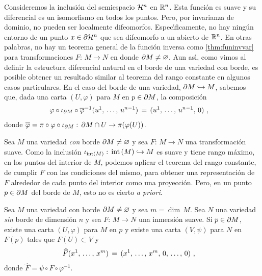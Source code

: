 Consideremos la inclusi\'{o}n del semiespacio $\hemi[n]$ en $\bb{R}^{n}$.
Esta funci\'{o}n es suave y su diferencial es un isomorfismo en todos los
puntos. Pero, por invarianza de dominio, no pueden ser localmente
difeomorfos. Espec\'{\i}ficamente, no hay ning\'{u}n entorno de un punto
$x\in\borde[{\hemi[n]}]$ que sea difeomorfo a un abierto de $\bb{R}^{n}$.
En otras palabras, no hay un teorema general de la funci\'{o}n inversa como
\ref{thm:funinvvar} para transformaciones $F:\,M\rightarrow N$ en donde
$\borde[M]\not =\varnothing$. Aun as\'{\i}, como vimos al definir la
estructura diferencial natural en el borde de una variedad con borde, es
posible obtener un resultado similar al teorema del rango constante en
algunos casos particulares. En el caso del borde de una variedad,
$\borde[M]\hookrightarrow M$, sabemos que, dada una carta $(U,\varphi)$
para $M$ en $p\in\borde[M]$, la composici\'{o}n
\begin{align*}
	\varphi\circ\inc[{\borde[M]}]\circ\overline{\varphi}^{-1}
		(\lista*{u}{n-1}) & \,=\,(\lista*{u}{n-1},\,0)
	\text{ ,}
\end{align*}
%
donde $\overline{\varphi}=\pi\circ\varphi\circ\inc[{\borde[M]}]:\,%
\borde[M]\cap U\rightarrow\pi(\varphi(U))$.

Sea $M$ una variedad \emph{con} borde $\borde[M]\not =\varnothing$ y sea
$F:\,M\rightarrow N$ una transformaci\'{o}n suave. Como la inclusi\'{o}n
$\inc[\interior{M}]:\,\interior{M}\hookrightarrow M$ es suave y tiene rango
m\'{a}ximo, en los puntos del interior de $M$, podemos aplicar el teorema
del rango constante, de cumplir $F$ con las condiciones del mismo, para
obtener una representaci\'{o}n de $F$ alrededor de cada punto del interior
como una proyecci\'{o}n. Pero, en un punto $p\in\borde[M]$ del borde de
$M$, esto no es cierto \emph{a priori}.

\begin{teoInmersionConBorde}%
	\label{thm:inmersionconborde}
	Sea $M$ una variedad con borde $\borde[M]\not =\varnothing$ y sea
	$m=\dim\,M$. Sea $N$ una variedad \emph{sin} borde de dimensi\'{o}n
	$n$ y sea $F:\,M\rightarrow N$ una inmersi\'{o}n suave. Si
	$p\in\borde[M]$, existe una carta $(U,\varphi)$ para $M$ en $p$
	y existe una carta $(V,\psi)$ para $N$ en $F(p)$ tales que
	$F(U)\subset V$ y
	\begin{align*}
		\widehat{F}(\lista*{x}{m}) & \,=\,
			(\lista*{x}{m},\,0,\,\dots,\,0)
		\text{ ,}
	\end{align*}
	donde $\widehat{F}=\psi\circ F\circ\varphi^{-1}$.
\end{teoInmersionConBorde}

